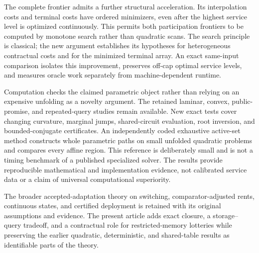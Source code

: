 The complete frontier admits a further structural acceleration. Its interpolation costs and terminal costs have ordered minimizers, even after the highest service level is optimized continuously. This permits both participation frontiers to be computed by monotone search rather than quadratic scans. The search principle is classical; the new argument establishes its hypotheses for heterogeneous contractual costs and for the minimized terminal array. An exact same-input comparison isolates this improvement, preserves off-cap optimal service levels, and measures oracle work separately from machine-dependent runtime.

Computation checks the claimed parametric object rather than relying on an expensive unfolding as a novelty argument. The retained laminar, convex, public-promise, and repeated-query studies remain available. New exact tests cover changing curvature, marginal jumps, shared-circuit evaluation, root inversion, and bounded-conjugate certificates. An independently coded exhaustive active-set method constructs whole parametric paths on small unfolded quadratic problems and compares every affine region. This reference is deliberately small and is not a timing benchmark of a published specialized solver. The results provide reproducible mathematical and implementation evidence, not calibrated service data or a claim of universal computational superiority.

The broader accepted-adaptation theory on switching, comparator-adjusted rents, continuous states, and certified deployment is retained with its original assumptions and evidence. The present article adds exact closure, a storage--query tradeoff, and a contractual role for restricted-memory lotteries while preserving the earlier quadratic, deterministic, and shared-table results as identifiable parts of the theory.

